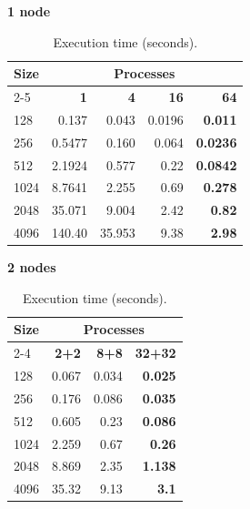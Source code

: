 \begin{table}[H]
\centering
\begin{minipage}[t]{0.48\textwidth}
\centering
\textbf{1 node}\\
\begin{tabular}{l|rrrr}
\hline
\textbf{Size} & \multicolumn{4}{c}{\textbf{Processes}} \\
\cline{2-5}
 & \textbf{1} & \textbf{4} & \textbf{16} & \textbf{64} \\
\hline
128 & 0.137 & 0.043 & 0.0196 & \textbf{0.011} \\
256 & 0.5477 & 0.160 & 0.064 & \textbf{0.0236} \\
512 & 2.1924 & 0.577 & 0.22 & \textbf{0.0842} \\
1024 & 8.7641 & 2.255 & 0.69 & \textbf{0.278} \\
2048 & 35.071 & 9.004 & 2.42 & \textbf{0.82} \\
4096 & 140.40 & 35.953 & 9.38 & \textbf{2.98} \\
\hline
\end{tabular}
\end{minipage}
\hfill
\begin{minipage}[t]{0.48\textwidth}
\centering
\textbf{2 nodes}\\
\begin{tabular}{l|rrr}
\hline
\textbf{Size} & \multicolumn{3}{c}{\textbf{Processes}} \\
\cline{2-4}
 & \textbf{2+2} & \textbf{8+8} & \textbf{32+32} \\
\hline
128 & 0.067 & 0.034 & \textbf{0.025} \\
256 & 0.176 & 0.086 & \textbf{0.035} \\
512 & 0.605 & 0.23 & \textbf{0.086} \\
1024 & 2.259 & 0.67 & \textbf{0.26} \\
2048 & 8.869 & 2.35 & \textbf{1.138} \\
4096 & 35.32 & 9.13 & \textbf{3.1} \\
\hline
\end{tabular}
\end{minipage}
\caption{Execution time (seconds).}
\end{table}

